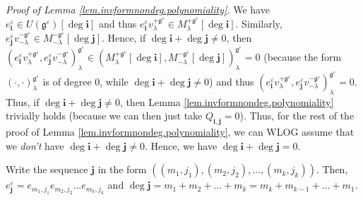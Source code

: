\documentclass
[numbers=enddot,12pt,final,onecolumn,german,notitlepage]{scrartcl}%
\theoremstyle{definition}
\begin{document}
\textit{Proof of Lemma \ref{lem.invformnondeg.polynomiality}.} We have
$e_{\mathbf{i}}^{\varepsilon}\in U\left(  \mathfrak{g}^{\varepsilon}\right)
\left[  \deg\mathbf{i}\right]  $ and thus $e_{\mathbf{i}}^{\varepsilon
}v_{\lambda}^{+\mathfrak{g}^{\varepsilon}}\in M_{\lambda}^{+\mathfrak{g}%
^{\varepsilon}}\left[  \deg\mathbf{i}\right]  $. Similarly, $e_{\mathbf{j}%
}^{\varepsilon}v_{-\lambda}^{-\mathfrak{g}^{\varepsilon}}\in M_{-\lambda
}^{-\mathfrak{g}^{\varepsilon}}\left[  \deg\mathbf{j}\right]  $. Hence, if
$\deg\mathbf{i}+\deg\mathbf{j}\neq0$, then $\left(  e_{\mathbf{i}%
}^{\varepsilon}v_{\lambda}^{+\mathfrak{g}^{\varepsilon}},e_{\mathbf{j}%
}^{\varepsilon}v_{-\lambda}^{-\mathfrak{g}^{\varepsilon}}\right)  _{\lambda
}^{\mathfrak{g}^{\varepsilon}}\in\left(  M_{\lambda}^{+\mathfrak{g}%
^{\varepsilon}}\left[  \deg\mathbf{i}\right]  ,M_{-\lambda}^{-\mathfrak{g}%
^{\varepsilon}}\left[  \deg\mathbf{j}\right]  \right)  _{\lambda
}^{\mathfrak{g}^{\varepsilon}}=0$ (because the form $\left(  \cdot
,\cdot\right)  _{\lambda}^{\mathfrak{g}^{\varepsilon}}$ is of degree $0$,
while $\deg\mathbf{i}+\deg\mathbf{j}\neq0$) and thus $\left(  e_{\mathbf{i}%
}^{\varepsilon}v_{\lambda}^{+\mathfrak{g}^{\varepsilon}},e_{\mathbf{j}%
}^{\varepsilon}v_{-\lambda}^{-\mathfrak{g}^{\varepsilon}}\right)  _{\lambda
}^{\mathfrak{g}^{\varepsilon}}=0$. Thus, if $\deg\mathbf{i}+\deg\mathbf{j}%
\neq0$, then Lemma \ref{lem.invformnondeg.polynomiality} trivially holds
(because we can then just take $Q_{\mathbf{i},\mathbf{j}}=0$). Thus, for the
rest of the proof of Lemma \ref{lem.invformnondeg.polynomiality}, we can WLOG
assume that we \textit{don't} have $\deg\mathbf{i}+\deg\mathbf{j}\neq0$.
Hence, we have $\deg\mathbf{i}+\deg\mathbf{j}=0$.

Write the sequence $\mathbf{j}$ in the form $\left(  \left(  m_{1}%
,j_{1}\right)  ,\left(  m_{2},j_{2}\right)  ,...,\left(  m_{k},j_{k}\right)
\right)  $. Then, $e_{\mathbf{j}}^{\varepsilon}=e_{m_{1},j_{1}}e_{m_{2},j_{2}%
}...e_{m_{k},j_{k}}$ and $\deg\mathbf{j}=m_{1}+m_{2}+...+m_{k}=m_{k}%
+m_{k-1}+...+m_{1}$.
\end{document}
